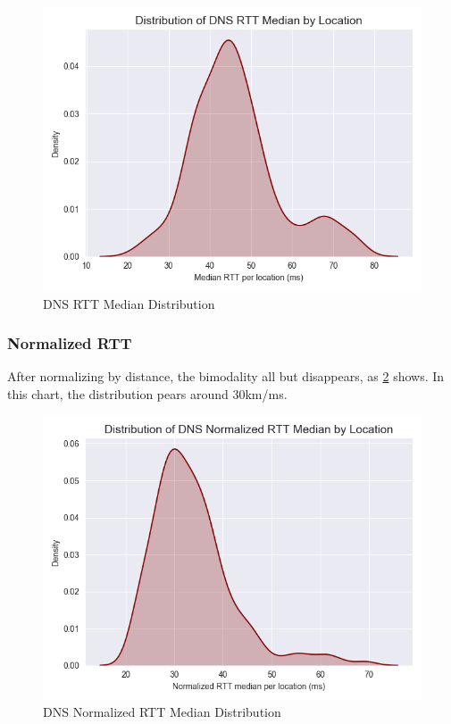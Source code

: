 \begin{figure}[H]
    \centering
    \includegraphics[width=\textwidth]{images/dns/dist_raw_data/dns_rtt_median_distribution.png}
    \caption{DNS RTT Median Distribution}
    \label{fig:dns_analytics_median_dist}
\end{figure}

\subsubsection{Normalized RTT}

After normalizing by distance, the bimodality all but disappears, as \cref{fig:dns_analytics_norm_median_dist} shows. In this chart, the distribution pears around 30km/ms.

\begin{figure}[H]
    \centering
    \includegraphics[width=\textwidth]{images/dns/dist_raw_data/dns_norm_rtt_median_distribution.png}
    \caption{DNS Normalized RTT Median Distribution}
    \label{fig:dns_analytics_norm_median_dist}
\end{figure}

